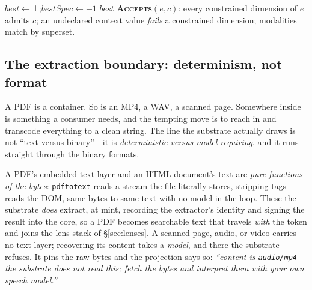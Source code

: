 \documentclass[10pt,twocolumn]{article}
\begin{document}
\begin{algorithm}[t]
\small
\caption{Sealed variant selection. Total over any manifest (mint
guarantees exactly one catch-all).}
\label{alg:match}
\DontPrintSemicolon
{}
$best \leftarrow \bot$;\quad $bestSpec \leftarrow -1$\;
\Return $best$\;
\BlankLine
\textbf{\textsc{Accepts}}$(e, c)$: every constrained dimension of $e$
admits $c$; an undeclared context value \emph{fails} a constrained
dimension; modalities match by superset.\;
\end{algorithm}

\subsection{The extraction boundary: determinism, not format}
\label{sec:opaque}

A PDF is a container. So is an MP4, a WAV, a scanned page. Somewhere inside is
something a consumer needs, and the tempting move is to reach in and transcode
everything to a clean string. The line the substrate actually draws is not
``text versus binary''---it is \emph{deterministic versus model-requiring}, and it
runs straight through the binary formats.

A PDF's embedded text layer and an HTML document's text are \emph{pure functions of
the bytes}: \texttt{pdftotext} reads a stream the file literally stores, stripping
tags reads the DOM, same bytes to same text with no model in the loop. These the
substrate \emph{does} extract, at mint, recording the extractor's identity and
signing the result into the core, so a PDF becomes searchable text that travels
\emph{with} the token and joins the lens stack of \S\ref{sec:lenses}. A scanned page,
audio, or video carries no text layer; recovering its content takes a \emph{model},
and there the substrate refuses. It pins the raw bytes and the projection says so:
\emph{``content is \texttt{audio/mp4}---the substrate does not read this; fetch the
bytes and interpret them with your own speech model.''}
\end{document}
